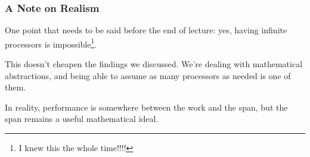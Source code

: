 \documentclass[aspectratio=169, handout]{beamer}
\begin{document}
\begin{frame}[fragile]
  \frametitle{ A Note on Realism }

  One point that needs to be said before the end of lecture: yes, having
  infinite processors is impossible\footnote{I knew this the whole time!!!!}.

  \pause
  \vspace{\fill}

  This doesn't cheapen the findings we discussed. We're dealing with
  mathematical abstractions, and being able to assume as many processors
  as needed is one of them.

  \pause
  \vspace{\fill}

  In reality, performance is somewhere between the work and the span, but
  the span remains a useful mathematical ideal.
\end{frame}



\thankyou
\end{document}
